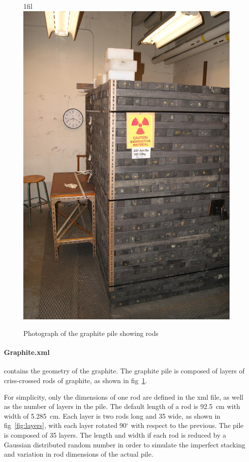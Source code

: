 \documentclass{article}
\makeatletter
\newcommand*{\centerfloat}{%
  \parindent \z@
  \leftskip \z@ \@plus 1fil \@minus \textwidth
  \rightskip\leftskip
  \parfillskip \z@skip}
\makeatother
\begin{document}
\begin{figure}[htb]
	\centerfloat
	\includegraphics[width=\columnwidth]{images/Rods}
	\caption{Photograph of the graphite pile showing rods}	
	\label{fig:graphiteRods}
\end{figure}

	\paragraph{Graphite.xml} contains the geometry of the graphite. The graphite pile is composed of layers of criss-crossed rods of graphite, as shown in fig~\ref{fig:graphiteRods}. 

	For simplicity, only the dimensions of one rod are defined in the xml file, as well as the number of layers in the pile. The default length of a rod is 92.5~cm with width of 5.285~cm. Each layer is two rods long and 35 wide, as shown in fig~\ref{fig:layers}, with each layer rotated 90$^{\circ}$ with respect to the previous. The pile is composed of 35 layers. The length and width if each rod is reduced by a Gaussian distributed random number in order to simulate the imperfect stacking and variation in rod dimensions of the actual pile. 
\end{document}
